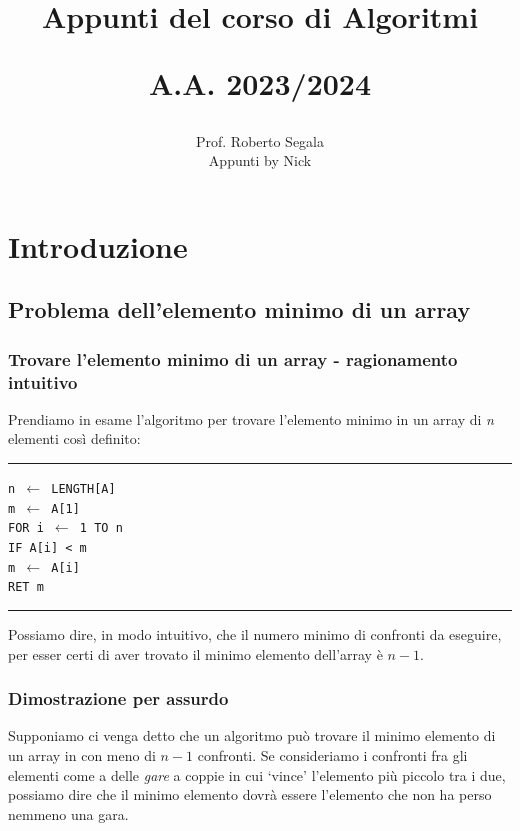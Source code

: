 \documentclass[a4paper,12pt,twoside]{report}
\newcommand\pseudo[1]{\setlength\parindent{0pt}\texttt{#1}\setlength\parindent{24pt} \\}
\newcommand\hlin{\noindent\rule[0.5ex]{\linewidth}{1pt}}
\begin{document}
\title{Appunti del corso di Algoritmi 

A.A. 2023/2024}
\author{Prof. Roberto Segala \\ 
Appunti by Nick}
\date{}
\maketitle
\tableofcontents

\chapter{Introduzione}
\section{Problema dell'elemento minimo di un array}

\subsection{Trovare l'elemento minimo di un array - ragionamento intuitivo}
Prendiamo in esame l'algoritmo per trovare l'elemento minimo in un array di 
\emph{n} elementi cos\`{i} definito:

\hlin

\pseudo{n $\leftarrow$ LENGTH[A]}
\texttt{m $\leftarrow$ A[1] \\
FOR i $\leftarrow$ 1 TO n \\
\indent IF A[i] < m \\
\indent\indent m $\leftarrow$ A[i] \\
RET m
}

\hlin

Possiamo dire, in modo intuitivo, che il numero minimo di confronti da eseguire, per
esser certi di aver trovato il minimo elemento dell'array \`{e} $n-1$.

\subsection{Dimostrazione per assurdo}
Supponiamo ci venga detto che un algoritmo pu\`{o} trovare il minimo elemento di un
array in con meno di $n-1$ confronti. Se consideriamo i confronti fra gli elementi come
a delle \emph{gare} a coppie in cui `vince' l'elemento pi\`{u} piccolo tra i due, 
possiamo dire che il minimo elemento dovr\`{a} essere l'elemento che non ha perso 
nemmeno una gara.
\end{document}

